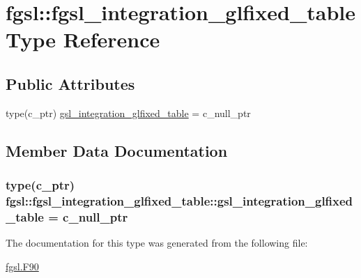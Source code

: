 \hypertarget{structfgsl_1_1fgsl__integration__glfixed__table}{}\section{fgsl\+:\+:fgsl\+\_\+integration\+\_\+glfixed\+\_\+table Type Reference}
\label{structfgsl_1_1fgsl__integration__glfixed__table}
\subsection*{Public Attributes}
\begin{DoxyCompactItemize}
\item 
type(c\+\_\+ptr) \hyperlink{structfgsl_1_1fgsl__integration__glfixed__table_a234ee30769fac15a9b4323135a796d3e}{gsl\+\_\+integration\+\_\+glfixed\+\_\+table} = c\+\_\+null\+\_\+ptr
\end{DoxyCompactItemize}


\subsection{Member Data Documentation}
\hypertarget{structfgsl_1_1fgsl__integration__glfixed__table_a234ee30769fac15a9b4323135a796d3e}{}
\subsubsection[{gsl\+\_\+integration\+\_\+glfixed\+\_\+table}]{\setlength{\rightskip}{0pt plus 5cm}type(c\+\_\+ptr) fgsl\+::fgsl\+\_\+integration\+\_\+glfixed\+\_\+table\+::gsl\+\_\+integration\+\_\+glfixed\+\_\+table = c\+\_\+null\+\_\+ptr}\label{structfgsl_1_1fgsl__integration__glfixed__table_a234ee30769fac15a9b4323135a796d3e}


The documentation for this type was generated from the following file\+:\begin{DoxyCompactItemize}
\item 
\hyperlink{fgsl_8F90}{fgsl.\+F90}\end{DoxyCompactItemize}
